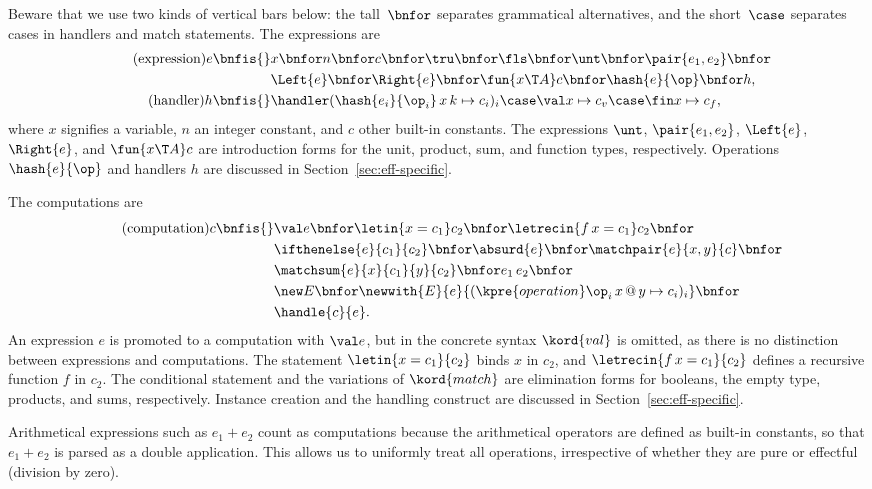 Beware that we use two kinds of vertical bars below: the tall~$\bnfor$ separates
grammatical alternatives, and the short~$\case$ separates cases in handlers and
match statements. The expressions are
%
\begin{align*}
  \tag{expression}
  e \bnfis {}
    &x \bnfor
    n \bnfor
    c \bnfor
    \tru \bnfor
    \fls \bnfor
    \unt \bnfor
    \pair{e_1, e_2} \bnfor \\
    &\Left{e} \bnfor \Right{e} \bnfor
    \fun{x \T A} c \bnfor
    \hash{e}{\op} \bnfor
    h, \\
  \tag{handler}
  h \bnfis {}
    &\handler
    (\hash{e_i}{\op_i} \, x \, k \mapsto c_i)_i \case
    \val x \mapsto c_v \case
    \fin x \mapsto c_f,
\end{align*}
%
where $x$ signifies a variable, $n$ an integer constant, and $c$ other built-in constants.
The expressions $\unt$, $\pair{e_1, e_2}$, $\Left{e}$, $\Right{e}$, and $\fun{x \T A} c$
are introduction forms for the unit, product, sum, and function types, respectively.
Operations $\hash{e}{\op}$ and handlers $h$ are discussed in
Section~\ref{sec:eff-specific}.

The computations are
%
\begin{align*}
  \tag{computation}
  c \bnfis {}
    &\val e \bnfor
    \letin{x = c_1} c_2 \bnfor
    \letrecin{f \, x = c_1} c_2 \bnfor \\
    &\ifthenelse{e}{c_1}{c_2} \bnfor
    \absurd{e} \bnfor
    \matchpair{e}{x, y}{c} \bnfor \\
    &\matchsum{e}{x}{c_1}{y}{c_2} \bnfor
    e_1 \, e_2 \bnfor \\
    &\new E \bnfor 
    \newwith{E}{e}{
      (\kpre{operation} \op_i \, x \, @ \, y \mapsto c_i)_i
    } \bnfor \\
    &\handle{c}{e}.
\end{align*}
%
An expression $e$ is promoted to a computation with $\val e$, but in the concrete syntax
$\kord{val}$ is omitted, as there is no distinction between expressions and computations.
%
The statement $\letin{x = c_1}{c_2}$ binds $x$ in $c_2$, and $\letrecin{f \, x =
  c_1}{c_2}$ defines a recursive function $f$ in $c_2$. The conditional statement and the
variations of $\kord{match}$ are elimination forms for booleans, the empty type, products,
and sums, respectively. Instance creation and the handling construct are discussed in Section~\ref{sec:eff-specific}.

Arithmetical expressions such as $e_1 + e_2$ count as computations because the arithmetical
operators are defined as built-in constants, so that $e_1 + e_2$ is parsed as a double
application. This allows us to uniformly treat all operations, irrespective
of whether they are pure or effectful (division by zero).

